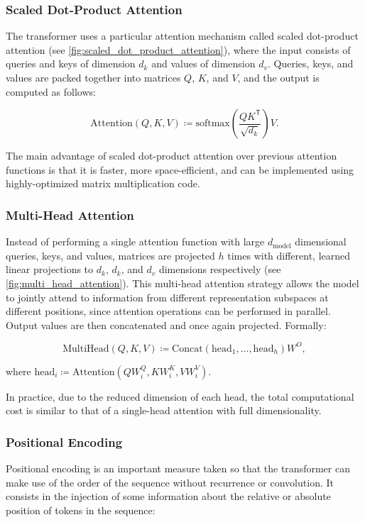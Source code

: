 \subsubsection{Scaled Dot-Product Attention}
The transformer uses a particular attention mechanism called scaled dot-product attention (see \autoref{fig:scaled_dot_product_attention}), where the input consists of queries and keys of dimension $d_k$ and values of dimension $d_v$. Queries, keys, and values are packed together into matrices $Q$, $K$, and $V$, and the output is computed as follows:

\[ \mathrm{Attention}(Q, K, V) \coloneqq \mathrm{softmax} \left( \frac{Q K^\mathsf{T}}{\sqrt{d_k}} \right) V .\]

The main advantage of scaled dot-product attention over previous attention functions is that it is faster, more space-efficient, and can be implemented using highly-optimized matrix multiplication code. 

\subsubsection{Multi-Head Attention}
Instead of performing a single attention function with large $d_\textrm{model}$ dimensional queries, keys, and values, matrices are projected $h$ times with different, learned linear projections to $d_k$, $d_k$, and $d_v$ dimensions respectively (see \autoref{fig:multi_head_attention}). This multi-head attention strategy allows the model to jointly attend to information from different representation subspaces at different positions, since attention operations can be performed in parallel. Output values are then concatenated and once again projected. Formally:

\[ \mathrm{MultiHead}(Q, K, V) \coloneqq \mathrm{Concat}\left(\mathrm{head}_1, \dots, \mathrm{head}_h \right) W^O , \]

where $\mathrm{head}_i \coloneqq \mathrm{Attention} \left( QW_i^Q, KW_i^K, VW_i^V \right)$.

In practice, due to the reduced dimension of each head, the total computational cost is similar to that of a single-head attention with full dimensionality.

\subsubsection{Positional Encoding}
Positional encoding is an important measure taken so that the transformer can make use of the order of the sequence without recurrence or convolution. It consists in the injection of some information about the relative or absolute position of tokens in the sequence:

